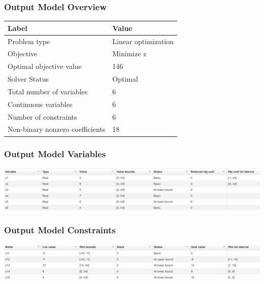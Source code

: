 \documentclass[14pt]{extarticle}
\begin{document}
\subsubsection*{Output Model Overview}
\begin{tabular}{|l|l|}
    \hline
    Label & Value \\
    \hline
    Problem type & Linear optimization \\
    \hline
    Objective & Minimize z \\
    \hline
    Optimal objective value & 146 \\
    \hline
    Solver Status & Optimal \\
    \hline
    Total number of variables & 6 \\
    \hline
    Continuous variables & 6 \\
    \hline
    Number of constraints & 6 \\
    \hline
    Non-binary nonzero coefficients & 18 \\
    \hline
\end{tabular}

\subsubsection*{Output Model Variables}
\includegraphics[width=\textwidth]{OutputVariables.PNG}

\subsubsection*{Output Model Constraints}
\includegraphics[width=\textwidth]{OutputConstraints.PNG}
\end{document}
